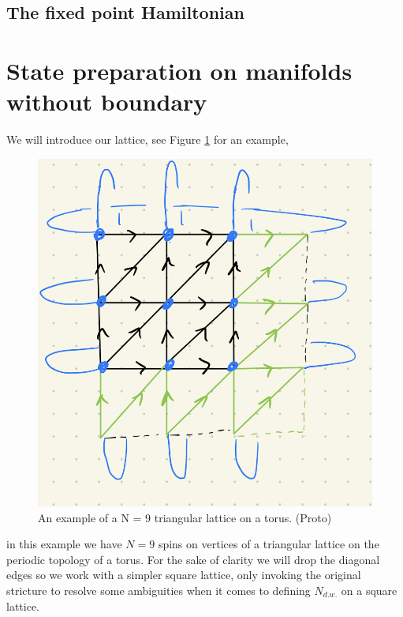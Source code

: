 \documentclass[a4paper,twocolumn,11pt]{quantumarticle}
\begin{document}
\subsection{The fixed point Hamiltonian}

\section{State preparation on manifolds without boundary}

We will introduce our lattice, see Figure \ref{fig:3x3pbc} for an example,
\begin{figure}
\centering
\includegraphics[width=\linewidth]{Figures/3x3_pbc.png}
\caption{An example of a N = 9 triangular lattice on a torus. (Proto)}
\label{fig:3x3pbc}
\end{figure}
in this example we have $N = 9$ spins on vertices of a triangular lattice on the periodic topology of a torus. For the sake of clarity we will drop the diagonal edges so we work with a simpler square lattice, only invoking the original stricture to resolve some ambiguities when it comes to defining $N_{d.w.}$ on a square lattice.
\end{document}

